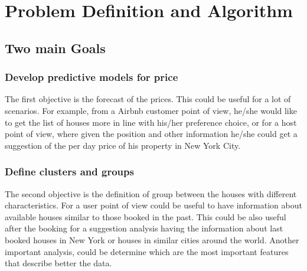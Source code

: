 \documentclass{FR16}
\begin{document}

\newpage
\section{Problem Definition and Algorithm}
\subsection{Two main Goals}

\subsubsection{Develop predictive models for price}
The first objective is the forecast of the prices. This could be useful for a lot of scenarios. For example, from a Airbnb customer point of view, he/she would like to get the list of houses more in line with his/her preference choice, or for a host point of view, where given the position and other information he/she could get a suggestion of the per day price of his property in New York City. 

\subsubsection{Define clusters and groups}
The second objective is the definition of group between the houses with different characteristics. For a user point of view could be useful to have information about available houses similar to those booked in the past. This could be also useful after the booking for a suggestion analysis having the information about last booked houses in New York or houses in similar cities around the world. Another important analysis, could be determine which are the most important features that describe better the data. 
\newpage
\end{document}
